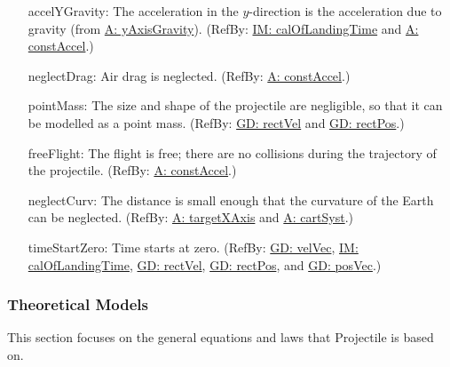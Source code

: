 \documentclass[12pt]{article}
\begin{document}
\begin{itemize}
\item[accelYGravity:\phantomsection\label{accelYGravity}]{The acceleration in the $y$-direction is the acceleration due to gravity (from \hyperref[yAxisGravity]{A: yAxisGravity}). (RefBy: \hyperref[IM:calOfLandingTime]{IM: calOfLandingTime} and \hyperref[constAccel]{A: constAccel}.)}
\item[neglectDrag:\phantomsection\label{neglectDrag}]{Air drag is neglected. (RefBy: \hyperref[constAccel]{A: constAccel}.)}
\item[pointMass:\phantomsection\label{pointMass}]{The size and shape of the projectile are negligible, so that it can be modelled as a point mass. (RefBy: \hyperref[GD:rectVel]{GD: rectVel} and \hyperref[GD:rectPos]{GD: rectPos}.)}
\item[freeFlight:\phantomsection\label{freeFlight}]{The flight is free; there are no collisions during the trajectory of the projectile. (RefBy: \hyperref[constAccel]{A: constAccel}.)}
\item[neglectCurv:\phantomsection\label{neglectCurv}]{The distance is small enough that the curvature of the Earth can be neglected. (RefBy: \hyperref[targetXAxis]{A: targetXAxis} and \hyperref[cartSyst]{A: cartSyst}.)}
\item[timeStartZero:\phantomsection\label{timeStartZero}]{Time starts at zero. (RefBy: \hyperref[GD:velVec]{GD: velVec}, \hyperref[IM:calOfLandingTime]{IM: calOfLandingTime}, \hyperref[GD:rectVel]{GD: rectVel}, \hyperref[GD:rectPos]{GD: rectPos}, and \hyperref[GD:posVec]{GD: posVec}.)}
\end{itemize}
\subsubsection{Theoretical Models}
\label{Sec:TMs}
This section focuses on the general equations and laws that Projectile is based on.
\par~
\end{document}
